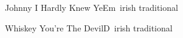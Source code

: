 \begin{song}{Johnny I Hardly Knew Ye}{Em}{~}{irish traditional}{}{}
	
\end{song}

\begin{song}{Whiskey You're The Devil}{D}{~}{irish traditional}{}{}
	
\end{song}

